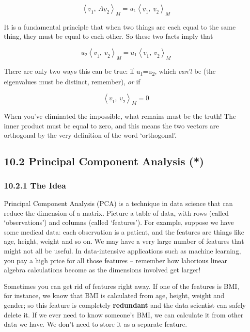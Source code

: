 \documentclass[oneside,english]{amsbook}
\numberwithin{section}{chapter}
\theoremstyle{plain}
\theoremstyle{definition}
\begin{document}
\[\left\langle {\underline{v}}_{1},\ A{\underline{v}}_{2} \right\rangle_{M} = u_{1}\left\langle {\underline{v}}_{1},\ {\underline{v}}_{2} \right\rangle_{M}\]

It is a fundamental principle that when two things are each equal to the
same thing, they must be equal to each other. So these two facts imply
that

\[u_{2}\left\langle {\underline{v}}_{1},\ {\underline{v}}_{2} \right\rangle_{M} = u_{1}\left\langle {\underline{v}}_{1},\ {\underline{v}}_{2} \right\rangle_{M}\]

There are only two ways this can be true: if
u\textsubscript{1­}=u­\textsubscript{2}, which \emph{can't} be (the
eigenvalues must be distinct, remember), \emph{or} if

\[\left\langle {\underline{v}}_{1},\ {\underline{v}}_{2} \right\rangle_{M} = 0\]

When you've eliminated the impossible, what remains must be the truth!
The inner product must be equal to zero, and this means the two vectors
are orthogonal by the very definition of the word `orthogonal'.

\subsection{10.2 Principal Component Analysis
	(*)}\label{principal-component-analysis}

\subsubsection{10.2.1 The Idea}\label{the-idea}

Principal Component Analysis (PCA) is a technique in data science that
can reduce the dimension of a matrix. Picture a table of data, with rows
(called `observations') and columns (called `features'). For
example, suppose we have some medical data: each observation is a
patient, and the features are things like age, height, weight and so on.
We may have a very large number of features that might not all be
useful. In data-intensive applications such as machine learning, you pay
a high price for all those features -- remember how laborious linear
algebra calculations become as the dimensions involved get larger!

Sometimes you can get rid of features right away. If one of the features
is BMI, for instance, we know that BMI is calculated from age, height,
weight and gender; so this feature is completely \textbf{redundant} and
the data scientist can safely delete it. If we ever need to know
someone's BMI, we can calculate it from other data we have. We don't
need to store it as a separate feature.
\end{document}
